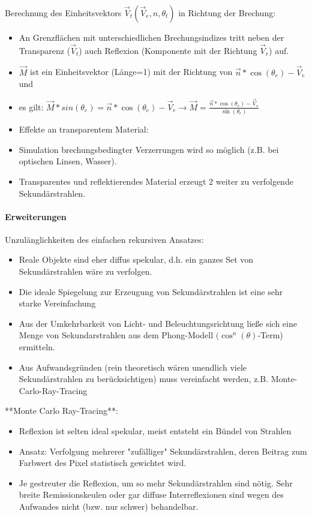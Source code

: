 \documentclass[10pt,landscape]{article}
\begin{document}
\begin{multicols}{3}
Berechnung des Einheitsvektors $\vec{V}_t(\vec{V}_e,n,\theta_t)$ in Richtung der Brechung:
\begin{itemize}
  \item An Grenzflächen mit unterschiedlichen Brechungsindizes tritt neben der Transparenz ($\vec{V}_t$) auch Reflexion (Komponente mit der Richtung $\vec{V}_r$) auf.
  \item $\vec{M}$ ist ein Einheitsvektor (Länge=1) mit der Richtung von $\vec{n}*\cos(\theta_e)-\vec{V}_e$ und
  \item es gilt: $\vec{M}*sin(\theta_e)=\vec{n}*\cos(\theta_e)-\vec{V}_e \rightarrow \vec{M}=\frac{\vec{n}*\cos(\theta_e)-\vec{V}_e}{\sin(\theta_e)}$
  \item Effekte an transparentem Material:
  \item Simulation brechungsbedingter Verzerrungen wird so möglich (z.B. bei optischen Linsen, Wasser).
  \item Transparentes und reflektierendes Material erzeugt 2 weiter zu verfolgende Sekundärstrahlen.
\end{itemize}



\paragraph{Erweiterungen}
Unzulänglichkeiten des einfachen rekursiven Ansatzes:
\begin{itemize}
  \item Reale Objekte sind eher diffus spekular, d.h. ein ganzes Set von Sekundärstrahlen wäre zu verfolgen.
  \item Die ideale Spiegelung zur Erzeugung von Sekundärstrahlen ist eine sehr starke Vereinfachung
  \item Aus der Umkehrbarkeit von Licht- und Beleuchtungsrichtung ließe sich eine Menge von Sekundarstrahlen aus dem Phong-Modell $(\cos^n(\theta)$-Term) ermitteln.
  \item Aus Aufwandsgründen (rein theoretisch wären unendlich viele Sekundärstrahlen zu berücksichtigen) muss vereinfacht werden, z.B. Monte-Carlo-Ray-Tracing
\end{itemize}

**Monte Carlo Ray-Tracing**:
\begin{itemize}
  \item Reflexion ist selten ideal spekular, meist entsteht ein Bündel von Strahlen
  \item Ansatz: Verfolgung mehrerer "zufälliger" Sekundärstrahlen, deren Beitrag zum Farbwert des Pixel statistisch gewichtet wird.
  \item Je gestreuter die Reflexion, um so mehr Sekundärstrahlen sind nötig. Sehr breite Remissionskeulen oder gar diffuse Interreflexionen sind wegen des Aufwandes nicht (bzw. nur schwer) behandelbar.
\end{itemize}


\end{multicols}
\end{document}
